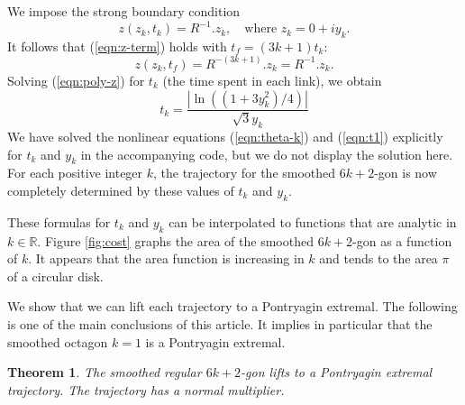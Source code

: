 \documentclass{article}
\newtheorem{theorem}{Theorem}[subsection]
\theoremstyle{remark}
\newcommand{\ring}[1]{\mathbb{#1}}
\begin{document}
We impose the strong boundary condition
\begin{equation}\label{eqn:poly-z}
z(z_k,t_k) = R^{-1}.z_k,\quad \text{where } z_k = 0 + i y_k.
\end{equation}
It follows that (\ref{eqn:z-term}) holds with $t_f = (3k+1) t_k$:
\[
z(z_k,t_f) = R^{-(3k+1)}.z_k = R^{-1}.z_k.
\]
Solving (\ref{eqn:poly-z}) for $t_k$ (the time spent in each link), we
obtain
\begin{equation}\label{eqn:t1}
t_k = \frac{|\ln ((1+ 3y_k^2)/4)|}{\sqrt{3} y_k} 
\end{equation}
We have solved the nonlinear equations (\ref{eqn:theta-k}) and
(\ref{eqn:t1}) explicitly for $t_k$ and $y_k$ in the accompanying
code, but we do not display the solution here.  For each positive
integer $k$, the trajectory for the smoothed $6k+2$-gon is now
completely determined by these values of $t_k$ and $y_k$.

These formulas for $t_k$ and $y_k$ can be interpolated to functions
that are analytic in $k\in \ring{R}$.  Figure \ref{fig:cost} graphs the area of the
smoothed $6k+2$-gon as a function of $k$.  It appears that the area
function is increasing in $k$ and tends to the area $\pi$ of a circular disk.

We show that we can lift each trajectory to a Pontryagin extremal.
The following is one of the main conclusions of this article.  It
implies in particular that the smoothed octagon $k=1$ is a Pontryagin
extremal.

\begin{theorem}\label{thm:pmp} 
The smoothed regular $6k+2$-gon lifts to a Pontryagin
  extremal trajectory.  The trajectory has a normal multiplier.
\end{theorem}
\end{document}
